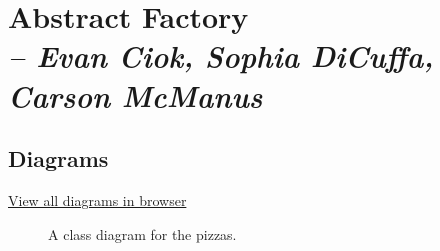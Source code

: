 \chapter{Abstract Factory \\
  \small{\textit{-- Evan Ciok, Sophia DiCuffa, Carson McManus}}
  \label{Chapter::AbstractFactory}}

\section{Diagrams}

\href{https://github.com/dyc3/ssw345-group-assignments/blob/main/Figures/abstractFactory/figures-source.md}{View all diagrams in browser}

\begin{figure}[hp!]
  \centering
  \caption{\label{Figure::pizzadiagram} A class diagram for the pizzas.}
\end{figure}

